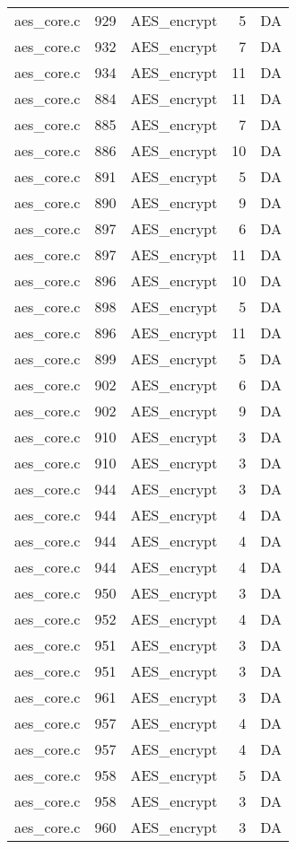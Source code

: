 \begin{table*}
\begin{tabular}{clrrr}
aes\_core.c&929&AES\_encrypt&5 &DA\\
aes\_core.c&932&AES\_encrypt&7 &DA\\
aes\_core.c&934&AES\_encrypt&11&DA\\
aes\_core.c&884&AES\_encrypt&11&DA\\
aes\_core.c&885&AES\_encrypt&7 &DA\\
aes\_core.c&886&AES\_encrypt&10&DA\\
aes\_core.c&891&AES\_encrypt&5 &DA\\
aes\_core.c&890&AES\_encrypt&9 &DA\\
aes\_core.c&897&AES\_encrypt&6 &DA\\
aes\_core.c&897&AES\_encrypt&11&DA\\
aes\_core.c&896&AES\_encrypt&10&DA\\
aes\_core.c&898&AES\_encrypt&5 &DA\\
aes\_core.c&896&AES\_encrypt&11&DA\\
aes\_core.c&899&AES\_encrypt&5 &DA\\
aes\_core.c&902&AES\_encrypt&6 &DA\\
aes\_core.c&902&AES\_encrypt&9 &DA\\
aes\_core.c&910&AES\_encrypt&3 &DA\\
aes\_core.c&910&AES\_encrypt&3 &DA\\
aes\_core.c&944&AES\_encrypt&3 &DA\\
aes\_core.c&944&AES\_encrypt&4 &DA\\
aes\_core.c&944&AES\_encrypt&4 &DA\\
aes\_core.c&944&AES\_encrypt&4 &DA\\
aes\_core.c&950&AES\_encrypt&3 &DA\\
aes\_core.c&952&AES\_encrypt&4 &DA\\
aes\_core.c&951&AES\_encrypt&3 &DA\\
aes\_core.c&951&AES\_encrypt&3 &DA\\
aes\_core.c&961&AES\_encrypt&3 &DA\\
aes\_core.c&957&AES\_encrypt&4 &DA\\
aes\_core.c&957&AES\_encrypt&4 &DA\\
aes\_core.c&958&AES\_encrypt&5 &DA\\
aes\_core.c&958&AES\_encrypt&3 &DA\\
aes\_core.c&960&AES\_encrypt&3 &DA\\
\hline
\end{tabular}
\end{table*}